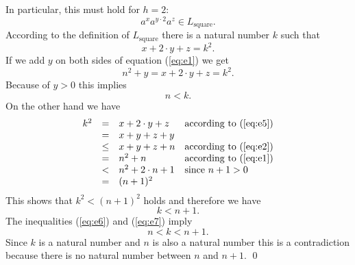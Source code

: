 In particular, this must hold for $h=2$:
\[ a^xa^{y\cdot 2}a^z \in L_{\mathrm{square}}.  \]
According to the definition of $L_{\mathrm{square}}$ there is a natural number $k$ such that
\begin{equation}
  \label{eq:e5}
  x + 2\cdot y + z = k^2.
\end{equation}
If we add $y$ on both sides of equation (\ref{eq:e1}) we get
\[ n^2 + y = x + 2\cdot y + z = k^2. \]
Because of $y > 0$ this implies
\begin{equation}
  \label{eq:e6}
  n < k.    
\end{equation}
On the other hand we have
\[ 
\begin{array}[t]{lcll}
 k^2  & =    & x + 2 \cdot y + z       & \mbox{according to (\ref{eq:e5}})   \\
      & =    & x + y + z + y           &                                       \\
      & \leq & x + y + z + n           & \mbox{according to (\ref{eq:e2}}) \\
      & =    & n^2 + n                 & \mbox{according to (\ref{eq:e1}})   \\
      & <    & n^2 + 2 \cdot n + 1     & \mbox{since $n+1 > 0$}                   \\ 
      & =    & (n + 1)^2               
\end{array}
\]
This shows that  $k^2 < (n+1)^2$ holds and therefore we have
\begin{equation}
  \label{eq:e7}
  k < n+1.
\end{equation}
The inequalities (\ref{eq:e6}) and (\ref{eq:e7}) imply
\[ n < k < n + 1. \]
Since $k$ is a natural number and $n$ is also a natural number this is a contradiction because there is no
natural number between  $n$ and $n+1$.
\qed


